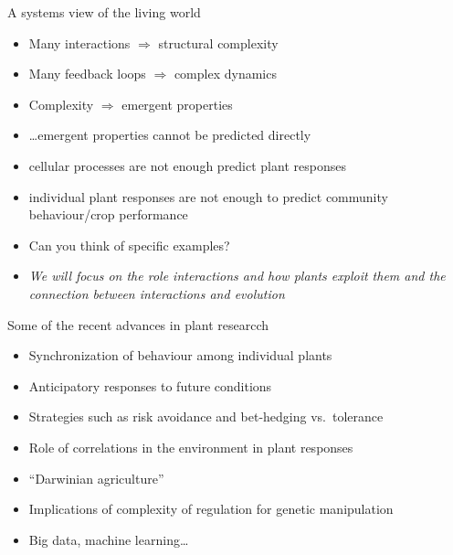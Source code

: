 \documentclass[10pt]{beamer}
\begin{document}
\begin{frame}{A systems view of the living world}
  \nocite{Capra2019}
  \begin{itemize}
    \item Many interactions $\Rightarrow$ structural complexity
    \item Many feedback loops $\Rightarrow$ complex dynamics
    \item Complexity $\Rightarrow$ emergent properties
    \item \ldots emergent properties cannot be predicted directly
    \item \Attention cellular processes are not enough predict plant responses
    \item \Attention individual plant responses are not enough to predict community behaviour/crop performance
    \item \DiscussionI Can you think of specific examples?
    \item \emph{We will focus on the role interactions and how plants
    exploit them and the connection between interactions and evolution}
  \end{itemize}
\end{frame}

\begin{frame}{Some of the recent advances in plant researcch}
   \begin{itemize}
     \item Synchronization of behaviour among individual plants
     \item Anticipatory responses to future conditions
     \item Strategies such as risk avoidance and bet-hedging vs.\ tolerance
     \item Role of correlations in the environment in plant responses
     \item ``Darwinian agriculture''
     \item Implications of complexity of regulation for genetic manipulation
     \item Big data, machine learning\ldots
   \end{itemize}
\end{frame}
\end{document}
